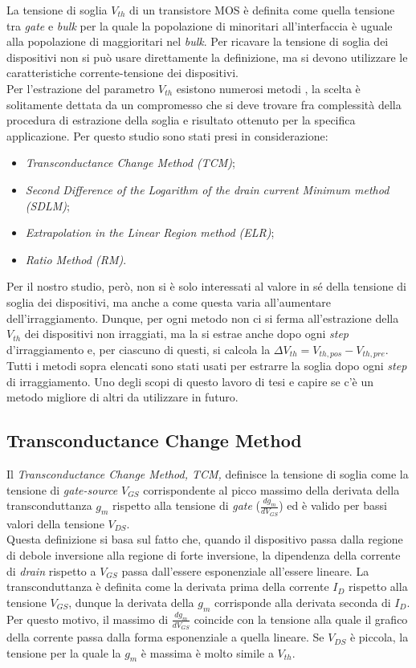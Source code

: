 La tensione di soglia $V_{th}$ di un transistore MOS è definita come quella tensione tra \emph{gate} e \emph{bulk} per la quale la popolazione di minoritari all'interfaccia è uguale alla popolazione di maggioritari nel \emph{bulk}. Per ricavare la tensione di soglia dei dispositivi non si può usare direttamente la definizione, ma si devono utilizzare le caratteristiche corrente-tensione dei dispositivi. \\
Per l'estrazione del parametro $V_{th}$ esistono numerosi metodi \cite{art2}, la scelta è solitamente dettata da un compromesso che si deve trovare fra complessità della procedura di estrazione della soglia e risultato ottenuto per la specifica applicazione. Per questo studio sono stati presi in considerazione:

\begin{itemize}
  \item \emph{Transconductance Change Method (TCM)};
  \item \emph{Second Difference of the Logarithm of the \emph{drain} current Minimum method (SDLM)};
  \item \emph{Extrapolation in the Linear Region method (ELR)};
  \item \emph{Ratio Method (RM)}.
\end{itemize}

Per il nostro studio, però, non si è solo interessati al valore in sé della tensione di soglia dei dispositivi, ma anche a come questa varia all'aumentare dell'irraggiamento. Dunque, per ogni metodo non ci si ferma all'estrazione della $V_{th}$ dei dispositivi non irraggiati, ma la si estrae anche dopo ogni \emph{step} d'irraggiamento e, per ciascuno di questi, si calcola la $\Delta V_{th} = V_{th,pos}-V_{th,pre}$. Tutti i metodi sopra elencati sono stati usati per estrarre la soglia dopo ogni \emph{step} di irraggiamento. Uno degli scopi di questo lavoro di tesi e capire se c'è un metodo migliore di altri da utilizzare in futuro.

\subsection[TCM]{Transconductance Change Method}
Il \emph{Transconductance Change Method, TCM,} definisce la tensione di soglia come la tensione di \emph{gate-source} $V_{GS}$ corrispondente al picco massimo della derivata della transconduttanza $g_m$ rispetto alla tensione di \emph{gate} ($\frac{dg_m}{dV_ {GS}}$) ed è valido per bassi valori della tensione $V_{DS}$.\\
Questa definizione si basa sul fatto che, quando il dispositivo passa dalla regione di debole inversione alla regione di forte inversione, la dipendenza della corrente di \emph{drain} rispetto a $V_{GS}$ passa dall'essere esponenziale all'essere lineare.
La transconduttanza è definita come la derivata prima della corrente $I_D$ rispetto alla tensione $V_{GS}$, dunque la derivata della $g_m$ corrisponde alla derivata seconda di $I_D$. Per questo motivo, il massimo di $\frac{dg_m}{dV_{GS}}$ coincide con la tensione alla quale il grafico della corrente passa dalla forma esponenziale a quella lineare. Se $V_{DS}$ è piccola, la tensione per la quale la $g_m$ è massima è molto simile a $V_{th}$.

